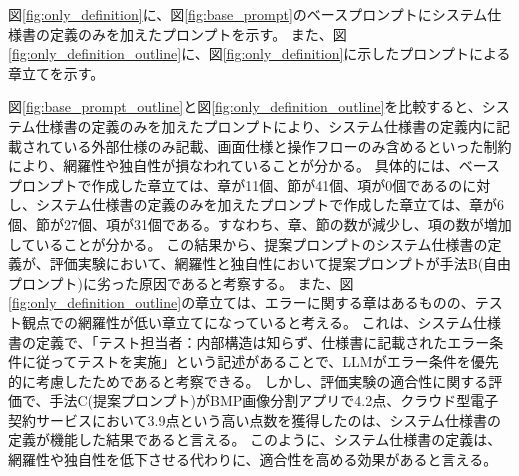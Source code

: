 図\ref{fig:only_definition}に、図\ref{fig:base_prompt}のベースプロンプトにシステム仕様書の定義のみを加えたプロンプトを示す。
また、図\ref{fig:only_definition_outline}に、図\ref{fig:only_definition}に示したプロンプトによる章立てを示す。

図\ref{fig:base_prompt_outline}と図\ref{fig:only_definition_outline}を比較すると、システム仕様書の定義のみを加えたプロンプトにより、システム仕様書の定義内に記載されている外部仕様のみ記載、画面仕様と操作フローのみ含めるといった制約により、網羅性や独自性が損なわれていることが分かる。
具体的には、ベースプロンプトで作成した章立ては、章が11個、節が41個、項が0個であるのに対し、システム仕様書の定義のみを加えたプロンプトで作成した章立ては、章が6個、節が27個、項が31個である。すなわち、章、節の数が減少し、項の数が増加していることが分かる。
この結果から、提案プロンプトのシステム仕様書の定義が、評価実験において、網羅性と独自性において提案プロンプトが手法B(自由プロンプト)に劣った原因であると考察する。
また、図\ref{fig:only_definition_outline}の章立ては、エラーに関する章はあるものの、テスト観点での網羅性が低い章立てになっていると考える。
これは、システム仕様書の定義で、「テスト担当者：内部構造は知らず、仕様書に記載されたエラー条件に従ってテストを実施」という記述があることで、LLMがエラー条件を優先的に考慮したためであると考察できる。
しかし、評価実験の適合性に関する評価で、手法C(提案プロンプト)がBMP画像分割アプリで4.2点、クラウド型電子契約サービスにおいて3.9点という高い点数を獲得したのは、システム仕様書の定義が機能した結果であると言える。
このように、システム仕様書の定義は、網羅性や独自性を低下させる代わりに、適合性を高める効果があると言える。

